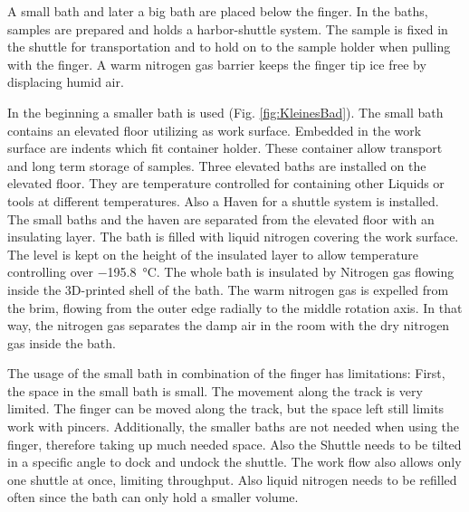 A small bath and later a big bath are placed below the finger. In the baths, samples are prepared and holds a harbor-shuttle system. The sample is fixed in the shuttle for transportation and to hold on to the sample holder when pulling with the finger. A warm nitrogen gas barrier keeps the finger tip ice free by displacing humid air.

In the beginning a smaller bath is used (Fig. \ref{fig:KleinesBad}). The small bath contains an elevated floor utilizing as work surface. Embedded in the work surface are indents which fit container holder. These container allow transport and long term storage of samples. Three elevated baths are installed on the elevated floor. They are temperature controlled for containing other Liquids or tools at different temperatures. Also a Haven for a shuttle system is installed. The small baths and the haven are separated from the elevated floor with an insulating layer. The bath is filled with liquid nitrogen covering the work surface. The level is kept on the height of the insulated layer to allow temperature controlling over \SI{-195.8}{\degreeCelsius}. The whole bath is insulated by Nitrogen gas flowing inside the 3D-printed shell of the bath. The warm nitrogen gas is expelled from the brim, flowing from the outer edge radially to the middle rotation axis. In that way, the nitrogen gas separates the damp air in the room with the dry nitrogen gas inside the bath.

The usage of the small bath in combination of the finger has limitations: First, the space in the small bath is small. The movement along the track is very limited. The finger can be moved along the track, but the space left still limits work with pincers. Additionally, the smaller baths are not needed when using the finger, therefore taking up much needed space. Also the Shuttle needs to be tilted in a specific angle to dock and undock the shuttle. The work flow also allows only one shuttle at once, limiting throughput. Also liquid nitrogen needs to be refilled often since the bath can only hold a smaller volume.

